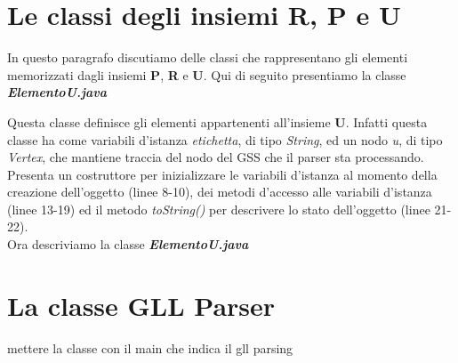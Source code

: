 \section{Le classi degli insiemi R, P e U}
In questo paragrafo discutiamo delle classi che rappresentano gli elementi memorizzati dagli insiemi \textbf{P}, \textbf{R} e \textbf{U}. Qui di seguito presentiamo la classe \textbf{\textit{ElementoU.java}}

Questa classe definisce gli elementi appartenenti all'insieme \textbf{U}. Infatti questa classe ha come variabili d'istanza \textit{etichetta}, di tipo \textit{String}, ed un nodo \textit{u}, di tipo \textit{Vertex}, che mantiene traccia del nodo del GSS che il parser sta processando. Presenta un costruttore per inizializzare le variabili d'istanza al momento della creazione dell'oggetto (linee 8-10), dei metodi d'accesso alle variabili d'istanza (linee 13-19) ed il metodo \textit{ toString()} per descrivere lo stato dell'oggetto (linee 21-22).\\
Ora descriviamo la classe \textbf{\textit{ElementoU.java}}


\section{La classe GLL Parser}
mettere la classe con il main che indica il gll parsing
